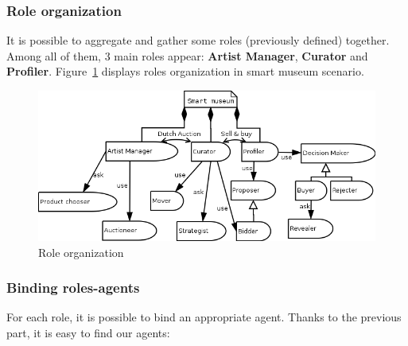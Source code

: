 \documentclass[a4paper,11pt]{report}
\begin{document}
  \subsubsection{Role organization}
  
  It is possible to aggregate and gather some roles (previously defined) together. Among all 
  of them, 3 main roles appear: \textbf{Artist Manager}, \textbf{Curator} and \textbf{Profiler}. 
  Figure~\ref{figure:role_organization} displays roles organization in smart museum scenario.
  
  \begin{figure}[ht!]
    \centering
    \includegraphics[width=\textwidth]{media/roles_organization.png}
    \caption{Role organization}
    \label{figure:role_organization}
  \end{figure}
  
  
  \subsubsection{Binding roles-agents}

  For each role, it is possible to bind an appropriate agent. Thanks to the previous part, 
  it is easy to find our agents:
  
  \newcommand{\ama}{\textit{ArtistManagerAgent}}
  \newcommand{\cua}{\textit{CuratorAgent}}
  \newcommand{\proa}{\textit{ProfilerAgent}}
  
\end{document}
